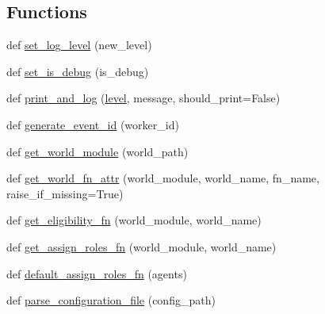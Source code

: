 \subsection*{Functions}
\begin{DoxyCompactItemize}
\item 
def \hyperlink{namespaceparlai_1_1chat__service_1_1services_1_1messenger_1_1shared__utils_a7dc5e90758e81aa2271a34f6730c7c79}{set\+\_\+log\+\_\+level} (new\+\_\+level)
\item 
def \hyperlink{namespaceparlai_1_1chat__service_1_1services_1_1messenger_1_1shared__utils_a9b1d6bb954152c2fbcca802ab4e60c0a}{set\+\_\+is\+\_\+debug} (is\+\_\+debug)
\item 
def \hyperlink{namespaceparlai_1_1chat__service_1_1services_1_1messenger_1_1shared__utils_aec85b06c02b1d4c28a9a6bbcc5cdad1b}{print\+\_\+and\+\_\+log} (\hyperlink{namespaceparlai_1_1chat__service_1_1services_1_1messenger_1_1shared__utils_a35382c2e2179499d2a3debea2689be93}{level}, message, should\+\_\+print=False)
\item 
def \hyperlink{namespaceparlai_1_1chat__service_1_1services_1_1messenger_1_1shared__utils_a0ecde97be784451ff38bc0cdce396e47}{generate\+\_\+event\+\_\+id} (worker\+\_\+id)
\item 
def \hyperlink{namespaceparlai_1_1chat__service_1_1services_1_1messenger_1_1shared__utils_a6285f6c110c5c6fc4ab5d33aaac628f3}{get\+\_\+world\+\_\+module} (world\+\_\+path)
\item 
def \hyperlink{namespaceparlai_1_1chat__service_1_1services_1_1messenger_1_1shared__utils_ade421ab07be47db0333a0fac599c07ef}{get\+\_\+world\+\_\+fn\+\_\+attr} (world\+\_\+module, world\+\_\+name, fn\+\_\+name, raise\+\_\+if\+\_\+missing=True)
\item 
def \hyperlink{namespaceparlai_1_1chat__service_1_1services_1_1messenger_1_1shared__utils_a3099521db089497f3e8c976a98dff7b9}{get\+\_\+eligibility\+\_\+fn} (world\+\_\+module, world\+\_\+name)
\item 
def \hyperlink{namespaceparlai_1_1chat__service_1_1services_1_1messenger_1_1shared__utils_a1cf883c977b3fcd06db0d998ae976871}{get\+\_\+assign\+\_\+roles\+\_\+fn} (world\+\_\+module, world\+\_\+name)
\item 
def \hyperlink{namespaceparlai_1_1chat__service_1_1services_1_1messenger_1_1shared__utils_a41d97da08376040ba475b042eae5784c}{default\+\_\+assign\+\_\+roles\+\_\+fn} (agents)
\item 
def \hyperlink{namespaceparlai_1_1chat__service_1_1services_1_1messenger_1_1shared__utils_a81d665344fc48303d4cc4cf8fe48066e}{parse\+\_\+configuration\+\_\+file} (config\+\_\+path)
\end{DoxyCompactItemize}

